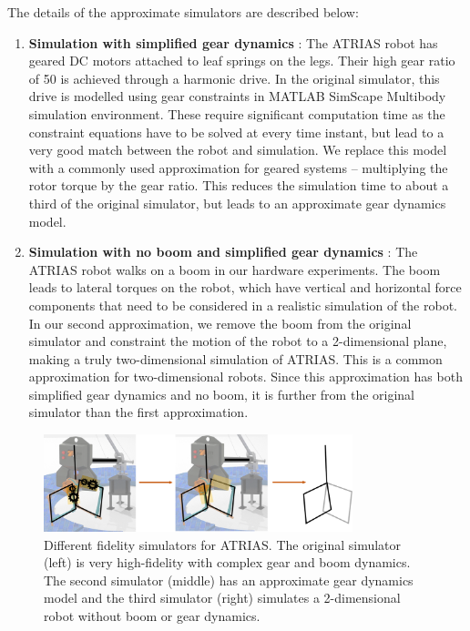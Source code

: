 The details of the approximate simulators are described below:

\begin{enumerate}
    \item \textbf{Simulation with simplified gear dynamics} : The ATRIAS robot has geared DC motors attached to leaf springs on the legs. Their high gear ratio of 50 is achieved through a harmonic drive. In the original simulator, this drive is modelled using gear constraints in MATLAB SimScape Multibody simulation environment. These require significant computation time as the constraint equations have to be solved at every time instant, but lead to a very good match between the robot and simulation. We replace this model with a commonly used approximation for geared systems -- multiplying the rotor torque by the gear ratio. This reduces the simulation time to about a third of the original simulator, but leads to an approximate gear dynamics model.

    \item \textbf{Simulation with no boom and simplified gear dynamics} : The ATRIAS robot walks on a boom in our hardware experiments. The boom leads to lateral torques on the robot, which have vertical and horizontal force components that need to be considered in a realistic simulation of the robot. In our second approximation, we remove the boom from the original simulator and constraint the motion of the robot to a 2-dimensional plane, making a truly two-dimensional simulation of ATRIAS. This is a common approximation for two-dimensional robots. Since this approximation has both simplified gear dynamics and no boom, it is further from the original simulator than the first approximation.

\end{enumerate}

\begin{figure}
    \centering
    \includegraphics[width = 0.8\textwidth]{img/atrias_gear_boom_simplification.png}
    \caption{Different fidelity simulators for ATRIAS. The original simulator (left) is very high-fidelity with complex gear and boom dynamics. The second simulator (middle) has an approximate gear dynamics model and the third simulator (right) simulates a 2-dimensional robot without boom or gear dynamics.}
    \label{fig:simulators}
\end{figure}

